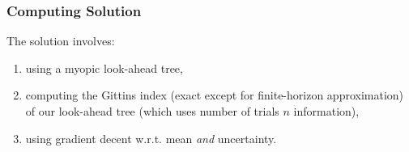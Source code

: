 \documentclass[a4paper,10pt]{article}
\begin{document}
\subsubsection{Computing Solution} \label{sec:computing-solution}

The solution involves:
\begin{enumerate}
 \item using a myopic look-ahead tree,
 \item computing the Gittins index (exact except for finite-horizon approximation) of our look-ahead tree (which uses number of trials $n$ information),
 \item using gradient decent w.r.t. mean \emph{and} uncertainty.
\end{enumerate}
\end{document}
